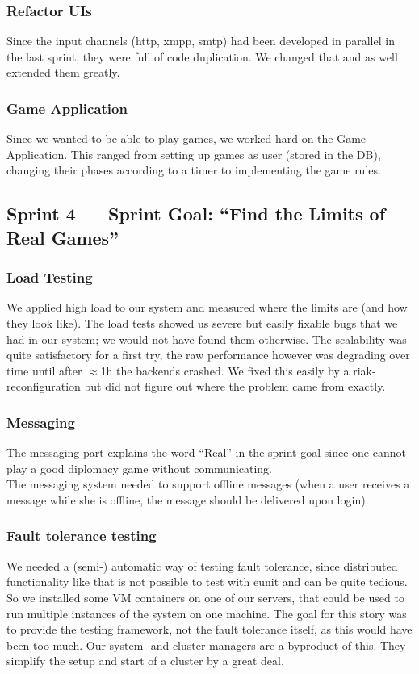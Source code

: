 \documentclass[11pt,a4paper]{report}
\begin{document}
\subsubsection{Refactor UIs}
Since the input channels (http, xmpp, smtp) had been developed in parallel in
the last sprint, they were full of code duplication. We changed that and as well
extended them greatly.
\subsubsection{Game Application}
Since we wanted to be able to play games, we worked hard on the Game
Application. This ranged from setting up games as user (stored in the DB),
changing their phases according to a timer to implementing the game rules.

\subsection*{Sprint 4 --- Sprint Goal: ``Find the Limits of Real Games''}
\subsubsection{Load Testing}
We applied high load to our system and measured where the limits are (and how
they look like). The load tests showed us severe but easily fixable bugs that
we had in our system; we would not have found them otherwise. The scalability
was quite satisfactory for a first try, the raw performance however was
degrading over time until after $\approx$1h the backends crashed. We fixed this
easily by a riak-reconfiguration but did not figure out where the problem came
from exactly.

\subsubsection{Messaging}
The messaging-part explains the word ``Real'' in the sprint goal since one
cannot play a good diplomacy game without communicating.\\
The messaging system needed to support offline messages (when a user receives a
message while she is offline, the message should be delivered upon login).

\subsubsection{Fault tolerance testing}
We needed a (semi-) automatic way of testing fault tolerance, since distributed
functionality like that is not possible to test with eunit and can be quite tedious.
So we installed some VM containers on one of our servers, that could be used to run
multiple instances of the system on one machine.
The goal for this story was to provide the testing framework, not the fault tolerance itself,
as this would have been too much.
Our system- and cluster managers are a byproduct of this.
They simplify the setup and start of a cluster by a great deal.
\end{document}
